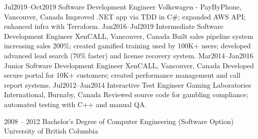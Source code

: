 \documentclass[9pt]{developercv}
\begin{document}
\begin{entrylist}
{    }
  \entry
    {Jul2019--Oct2019}
    {Software Development Engineer}
    {Volkswagen - PayByPhone, Vancouver, Canada}
    {
      Improved .NET app via TDD in C\#; expanded AWS API; enhanced infra with Terraform.
    }
  \entry
    {Jan2016--Jul2019}
    {Intermediate Software Development Engineer}
    {XenCALL, Vancouver, Canada}
    {
      Built sales pipeline system increasing sales 200\%; created gamified training used by 100K+ users; developed advanced lead search (70\% faster) and license recovery system.
    }
  \entry
    {Mar2014--Jan2016}
    {Junior Software Development Engineer}
    {XenCALL, Vancouver, Canada}
    {
      Developed secure portal for 10K+ customers; created performance management and call report systems.
    }
  \entry
    {Jul2012--Jan2014}
    {Interactive Test Engineer}
    {Gaming Laboratories International, Burnaby, Canada}
    {
      Reviewed source code for gambling compliance; automated testing with C++ and manual QA.
    }
\end{entrylist}



\begin{entrylist}
  \entry
    {2008 -- 2012}
    {Bachelor's Degree of Computer Engineering (Software Option)}
    {University of British Columbia}
    {}
\end{entrylist}
\end{document}
